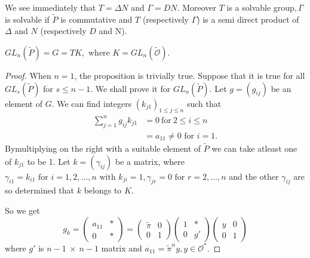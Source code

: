We see immediately that $T = \Delta N$ and  $\Gamma=DN$. Moreover $T$
is a solvable group$,\Gamma$ is solvable if $\widetilde{P}$ is
commutative and $T$ (respectively $\Gamma$) is a semi direct product of
$\Delta$ and $N$ (respectively $D$ and N).  

\setcounter{proposition}{0}
\begin{proposition}\label{part2:chap2:sec2:prop1}
  $G L_n(\tilde{P}) = G =TK, \text{ where } K=G L_n(\tilde{\mathscr{O}})$. 
\end{proposition}

\begin{proof}
  When $n=1$, the proposition is trivially true. Suppose that it is
  true for all $G L_s(\widetilde{P})$ for $s \leq n-1$. We shall prove
  it for $G L_n(\widetilde{P})$.    
  Let $g = (g_{ij})$ be an element of $G$. We can find integers
  $(k_{j1})_{1 \leq j \leq n}$ such that  
\begin{align*}
  \sum ^{n}_{j=1} g_{ij} k_{j1}& = 0 ~\text{for}~ 2 \leq i \leq n \\
  & = a_{11} \neq 0 \text{ for }i =1.
\end{align*}
By\pageoriginale multiplying on the right with a suitable element of
$\widetilde{P}$ 
we can take atleast one of $k_{j1}$ to be 1. Let $k = (\gamma_{ij})$
be a matrix, where $\gamma_{i1}=k_{i1} \text{ for } i = 1,2,\ldots,n
\text{ with } k_{ji}=1, \gamma_{jr}=0 \text{ for } r= 2, \ldots,n$ and
the other $\gamma_{ij}$ are so determined that $k$ belongs to $K$. 

So we get 
\begin{equation*}g_k=
  \begin{pmatrix}
    a_{11}&*\\
    0&*
  \end{pmatrix}
  =
  \begin{pmatrix}
    \widetilde{\pi}&0\\
    0 & 1
  \end{pmatrix}
  \begin{pmatrix}
    1 & *\\
    0 & g'
  \end{pmatrix}
  \begin{pmatrix}
    y & 0 \\
    0 & 1
  \end{pmatrix}
\end{equation*} 
where $g'$ is $n- 1~ \times ~n -1$ matrix and $a_{11}=
\tilde{\pi}^{\alpha}y, y \in \mathscr{O}^*$. 
\end{proof}

